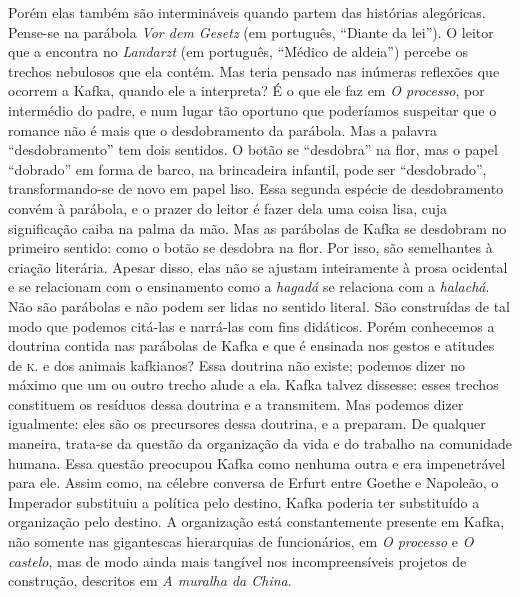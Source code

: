 Porém elas também são intermináveis quando partem das histórias
alegóricas. Pense-se na parábola \textit{Vor dem Gesetz} (em português, ``Diante da lei''). O
leitor que a encontra no \textit{Landarzt} (em português, ``Médico de aldeia'') percebe os
trechos nebulosos que ela contém. Mas teria pensado nas inúmeras
reflexões que ocorrem a Kafka, quando ele a interpreta? É o que ele faz
em \textit{O processo}, por intermédio do padre, e num lugar tão oportuno que
poderíamos suspeitar que o romance não é mais que o desdobramento da
parábola. Mas a palavra ``desdobramento'' tem dois sentidos. O botão se
``desdobra'' na flor, mas o papel ``dobrado'' em forma de barco, na
brincadeira infantil, pode ser ``desdobrado'', transformando-se de novo
em papel liso. Essa segunda espécie de desdobramento convém à parábola,
e o prazer do leitor é fazer dela uma coisa lisa, cuja significação
caiba na palma da mão. Mas as parábolas de Kafka se desdobram no
primeiro sentido: como o botão se desdobra na flor. Por isso, são
semelhantes à criação literária. Apesar disso, elas não se ajustam
inteiramente à prosa ocidental e se relacionam com o ensinamento como a
\textit{hagadá} se relaciona com a \textit{halachá}. Não são parábolas e não podem
ser lidas no sentido literal. São construídas de tal modo que podemos
citá-las e narrá-las com fins didáticos. Porém conhecemos a doutrina
contida nas parábolas de Kafka e que é ensinada nos gestos e atitudes de
\textsc{k.} e dos animais kafkianos? Essa doutrina não existe; podemos dizer no
máximo que um ou outro trecho alude a ela. Kafka talvez dissesse: esses
trechos constituem os resíduos dessa doutrina e a transmitem. Mas
podemos dizer igualmente: eles são os precursores dessa doutrina, e a
preparam. De qualquer maneira, trata-se da questão da organização da
vida e do trabalho na comunidade humana. Essa questão preocupou Kafka
como nenhuma outra e era impenetrável para ele. Assim como, na célebre
conversa de Erfurt entre Goethe e Napoleão, o Imperador substituiu a
política pelo destino, Kafka poderia ter substituído a organização pelo
destino. A organização está constantemente presente em Kafka, não
somente nas gigantescas hierarquias de funcionários, em \textit{O processo} e
\textit{O castelo}, mas de modo ainda mais tangível nos incompreensíveis
projetos de construção, descritos em \textit{A muralha da China}.

